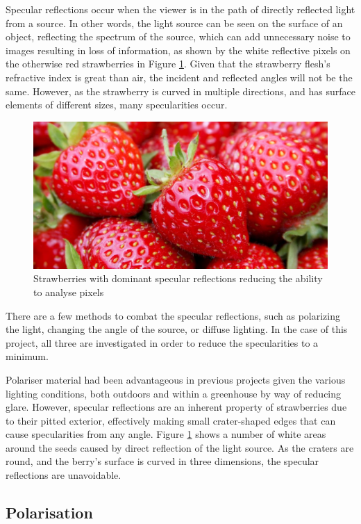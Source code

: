 \documentclass[fleqn,twoside,12pt]{report}
\begin{document}
Specular reflections occur when the viewer is in the path of directly reflected light from a source. In other words, the light source can be seen on the surface of an object, reflecting the spectrum of the source, which can add unnecessary noise to images resulting in loss of information, as shown by the white reflective pixels on the otherwise red strawberries in Figure \ref{fig:strawberry_glare}\cite{gurney}. Given that the strawberry flesh's refractive index is great than air, the incident and reflected angles will not be the same. However, as the strawberry is curved in multiple directions, and has surface elements of different sizes, many specularities occur. 

\begin{figure}[h]
	\centering
	\includegraphics[width=.6\linewidth]{strawberry_glare.jpg}
	\caption{Strawberries with dominant specular reflections reducing the ability to analyse pixels}
	\label{fig:strawberry_glare}
\end{figure}%

There are a few methods to combat the specular reflections, such as polarizing the light, changing the angle of the source, or diffuse lighting. In the case of this project, all three are investigated in order to reduce the specularities to a minimum. 

Polariser material had been advantageous in previous projects given the various lighting conditions, both outdoors and within a greenhouse by way of reducing glare. However, specular reflections are an inherent property of strawberries due to their pitted exterior, effectively making small crater-shaped edges that can cause specularities from any angle. Figure \ref{fig:strawberry_glare} shows a number of white areas around the seeds caused by direct reflection of the light source. As the craters are round, and the berry's surface is curved in three dimensions, the specular reflections are unavoidable.


\subsection{Polarisation}
\end{document}
